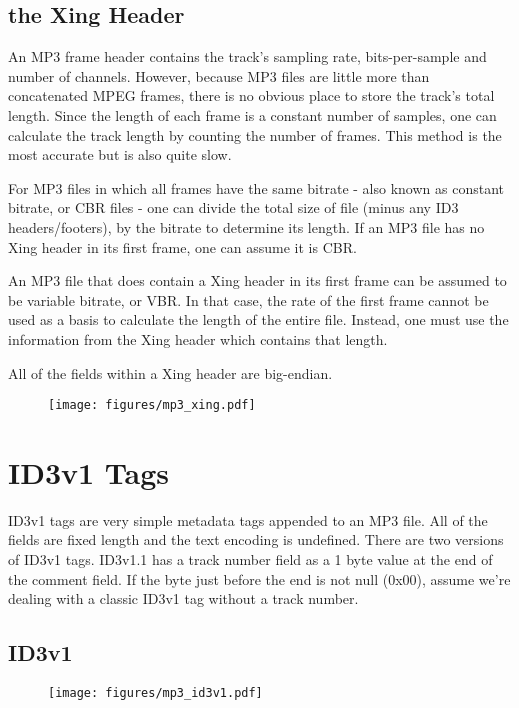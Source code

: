 \subsection{the Xing Header}

An MP3 frame header contains the track's sampling rate,
bits-per-sample and number of channels.
However, because MP3 files are little more than
concatenated MPEG frames, there is no obvious place to
store the track's total length.
Since the length of each frame is a constant number of samples,
one can calculate the track length by counting the number of frames.
This method is the most accurate but is also quite slow.

For MP3 files in which all frames have the same bitrate
- also known as constant bitrate, or CBR files -
one can divide the total size of file (minus any ID3 headers/footers),
by the bitrate to determine its length.
If an MP3 file has no Xing header in its first frame,
one can assume it is CBR.

An MP3 file that does contain a Xing header in its first frame
can be assumed to be variable bitrate, or VBR.
In that case, the rate of the first frame cannot be used as a
basis to calculate the length of the entire file.
Instead, one must use the information from the Xing header
which contains that length.

All of the fields within a Xing header are big-endian.
\begin{figure}[h]
\texttt{[image: figures/mp3\_xing.pdf]}
\end{figure}

\section{ID3v1 Tags}
ID3v1 tags are very simple metadata tags appended to an MP3 file.
All of the fields are fixed length and the text encoding is
undefined.
There are two versions of ID3v1 tags.
ID3v1.1 has a track number field as a 1 byte value
at the end of the comment field.
If the byte just before the end is not null (0x00),
assume we're dealing with a classic ID3v1 tag without a
track number.

\subsection{ID3v1}

\begin{figure}[h]
\texttt{[image: figures/mp3\_id3v1.pdf]}
\end{figure}

